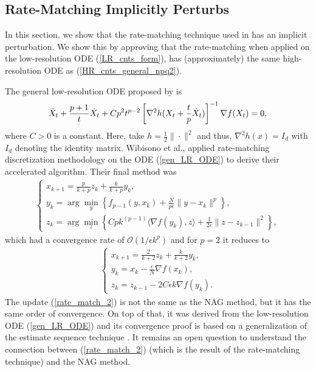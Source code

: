 \documentclass{article}
\theoremstyle{plain}
\theoremstyle{definition}
\theoremstyle{remark}
\begin{document}
\subsection{Rate-Matching Implicitly Perturbs}
In this section, we show that the rate-matching technique used in \cite{WibisonoE7351} has an implicit perturbation. We show this by approving that the rate-matching when applied on the low-resolution ODE (\ref{LR_cnts_form}), has (approximately) the same high-resolution ODE as (\ref{HR_cnts_general_npq2}).  \par
The general low-resolution ODE proposed by \cite{WibisonoE7351} is
\begin{align}\label{gen_LR_ODE}
    \Ddot{X}_t+\frac{p+1}{t}\dot X_t +Cp^2t^{p-2}\left[\nabla^2 h(X_t+\frac{t}{p}\dot X_t)\right]^{-1}\nabla f(X_t)=0,
\end{align}
where $C>0$ is a constant. Here, take $h=\frac{1}{2}\|\cdot\|^2$ and thus, $\nabla^2 h(x)=I_d$ with $I_d$ denoting the identity matrix. Wibisono et al., applied rate-matching discretization methodology on the ODE (\ref{gen_LR_ODE}) to derive their accelerated algorithm. Their final method was 
\begin{align}\label{rate_match_1}
    \left\{\begin{array}{l}
    x_{k+1}=\frac{p}{k+p}z_k+\frac{k}{k+p}y_k,\\
    y_{k}=\arg \min_y\left\{ f_{p-1}(y,x_{k})+\frac{N}{p\epsilon}\|y-x_k\|^p  \right\},   \\
        z_{k}=\arg \min_z\left\{ Cpk^{(p-1)}\langle 
\nabla f(y_{k}),z \rangle+\frac{1}{2\epsilon}\|z-z_{k-1}\|^2  \right\},    
    \end{array}\right.
\end{align}
which had a convergence rate of $\mathcal{O}(1/\epsilon k^p)$ and for $p=2$ it reduces to
\begin{align}\label{rate_match_2}
    \left\{\begin{array}{l}
    x_{k+1}=\frac{2}{k+2}z_k+\frac{k}{k+2}y_k,\\
    y_{k}=x_k-\frac{\epsilon}{N}\nabla f(x_k),   \\
    z_{k}=z_{k-1} -2C\epsilon k\nabla f(y_k)  .    
    \end{array}\right.
\end{align}
The update (\ref{rate_match_2}) is not the same as the NAG method, but it has the same order of convergence. On top of that, it was derived from the low-resolution ODE (\ref{gen_LR_ODE}) and its convergence proof is based on a generalization of the estimate sequence technique \cite{baes2009estimate}. It remains an open question to understand the connection between (\ref{rate_match_2}) (which is the result of the rate-matching technique) and the NAG method. \par
\end{document}
